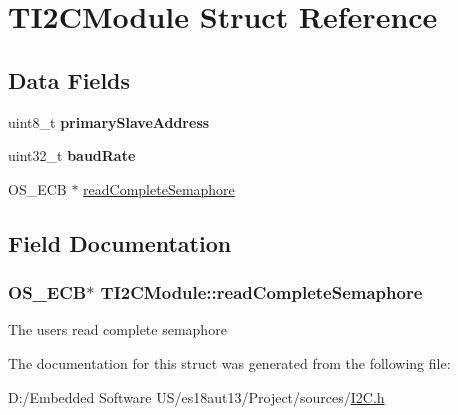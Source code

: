 \hypertarget{struct_t_i2_c_module}{}\section{T\+I2\+C\+Module Struct Reference}
\label{struct_t_i2_c_module}
\subsection*{Data Fields}
\begin{DoxyCompactItemize}
\item 
\hypertarget{struct_t_i2_c_module_a47196c499db62742e6483617bdf54a28}{}uint8\+\_\+t {\bfseries primary\+Slave\+Address}\label{struct_t_i2_c_module_a47196c499db62742e6483617bdf54a28}

\item 
\hypertarget{struct_t_i2_c_module_ad03b4abd3fe582e000053d272103ca2c}{}uint32\+\_\+t {\bfseries baud\+Rate}\label{struct_t_i2_c_module_ad03b4abd3fe582e000053d272103ca2c}

\item 
O\+S\+\_\+\+E\+C\+B $\ast$ \hyperlink{struct_t_i2_c_module_a8cd7fcfcbb1139749ca87663be6454f0}{read\+Complete\+Semaphore}
\end{DoxyCompactItemize}


\subsection{Field Documentation}
\hypertarget{struct_t_i2_c_module_a8cd7fcfcbb1139749ca87663be6454f0}{}
\subsubsection[{read\+Complete\+Semaphore}]{\setlength{\rightskip}{0pt plus 5cm}O\+S\+\_\+\+E\+C\+B$\ast$ T\+I2\+C\+Module\+::read\+Complete\+Semaphore}\label{struct_t_i2_c_module_a8cd7fcfcbb1139749ca87663be6454f0}
The user\textquotesingle{}s read complete semaphore 

The documentation for this struct was generated from the following file\+:\begin{DoxyCompactItemize}
\item 
D\+:/\+Embedded Software U\+S/es18aut13/\+Project/sources/\hyperlink{_i2_c_8h}{I2\+C.\+h}\end{DoxyCompactItemize}
